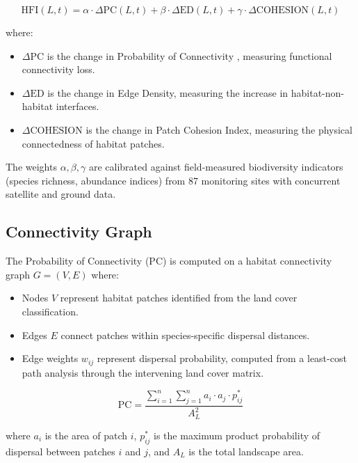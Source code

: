 \documentclass[11pt,a4paper]{article}
\begin{document}
\begin{equation}
    \text{HFI}(L, t) = \alpha \cdot \Delta\text{PC}(L, t) + \beta \cdot \Delta\text{ED}(L, t) + \gamma \cdot \Delta\text{COHESION}(L, t)
\end{equation}

\noindent where:
\begin{itemize}[leftmargin=*]
    \item $\Delta\text{PC}$ is the change in Probability of Connectivity \citep{saura2007new}, measuring functional connectivity loss.
    \item $\Delta\text{ED}$ is the change in Edge Density, measuring the increase in habitat-non-habitat interfaces.
    \item $\Delta\text{COHESION}$ is the change in Patch Cohesion Index, measuring the physical connectedness of habitat patches.
\end{itemize}

The weights $\alpha, \beta, \gamma$ are calibrated against field-measured biodiversity indicators (species richness, abundance indices) from 87 monitoring sites with concurrent satellite and ground data.

\subsection{Connectivity Graph}

The Probability of Connectivity (PC) is computed on a habitat connectivity graph $G = (V, E)$ where:
\begin{itemize}[leftmargin=*]
    \item Nodes $V$ represent habitat patches identified from the land cover classification.
    \item Edges $E$ connect patches within species-specific dispersal distances.
    \item Edge weights $w_{ij}$ represent dispersal probability, computed from a least-cost path analysis through the intervening land cover matrix.
\end{itemize}

\begin{equation}
    \text{PC} = \frac{\sum_{i=1}^{n} \sum_{j=1}^{n} a_i \cdot a_j \cdot p_{ij}^*}{A_L^2}
\end{equation}

\noindent where $a_i$ is the area of patch $i$, $p_{ij}^*$ is the maximum product probability of dispersal between patches $i$ and $j$, and $A_L$ is the total landscape area.
\end{document}
